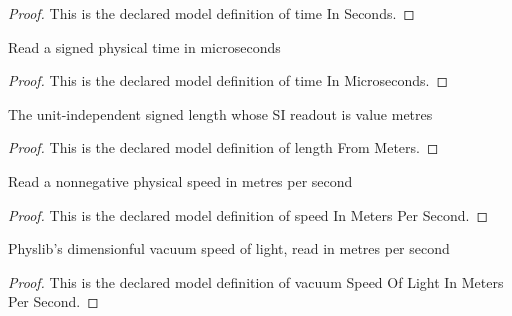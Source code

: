 \begin{proof}
  This is the declared model definition of time In Seconds.
\end{proof}
\begin{definition}
  \label{def:physics:phyx-mini-0598:phyxminiproblems-problemphyxmini0598-timeinmicroseconds}
  Read a signed physical time in microseconds
\end{definition}
\begin{proof}
  This is the declared model definition of time In Microseconds.
\end{proof}
\begin{definition}
  \label{def:physics:phyx-mini-0598:phyxminiproblems-problemphyxmini0598-lengthfrommeters}
  The unit-independent signed length whose SI readout is value metres
\end{definition}
\begin{proof}
  This is the declared model definition of length From Meters.
\end{proof}
\begin{definition}
  \label{def:physics:phyx-mini-0598:phyxminiproblems-problemphyxmini0598-speedinmeterspersecond}
  Read a nonnegative physical speed in metres per second
\end{definition}
\begin{proof}
  This is the declared model definition of speed In Meters Per Second.
\end{proof}
\begin{definition}
  \label{def:physics:phyx-mini-0598:phyxminiproblems-problemphyxmini0598-vacuumspeedoflightinmeterspersecond}
  Physlib's dimensionful vacuum speed of light, read in metres per second
\end{definition}
\begin{proof}
  This is the declared model definition of vacuum Speed Of Light In Meters Per Second.
\end{proof}
